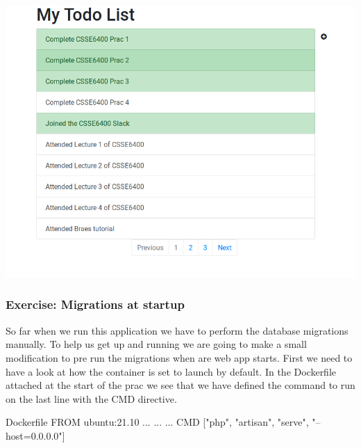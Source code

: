 \documentclass{csse4400}
\begin{document}
\includegraphics[width=\textwidth]{images/todoapp}


\subsubsection{Exercise: Migrations at startup}

So far when we run this application we have to perform the database migrations manually. To help us get up and running
we are going to make a small modification to pre run the migrations when are web app starts. First we need to have a look
at how the container is set to launch by default. In the Dockerfile attached at the start of the prac we see that we have
defined the command to run on the last line with the CMD directive.

\begin{code}[language=docker]{Dockerfile}
  FROM ubuntu:21.10
  ... 
  ... 
  ...
  CMD ["php", "artisan", "serve", "--host=0.0.0.0"]
\end{code}
\end{document}
